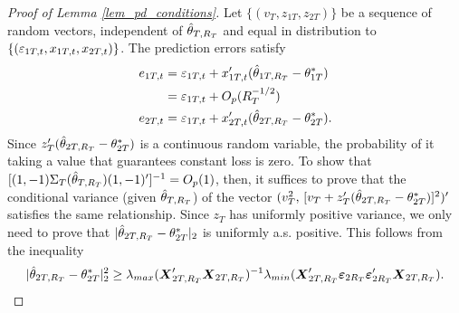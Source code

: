 \documentclass[11pt]{article} \def\baselinestretch{1.08}
\begin{document}
\begin{proof}[Proof of Lemma \ref{lem_pd_conditions}]
  Let $\{(v_T, z_{1T}, z_{2T})\}$ be a sequence of random vectors,
  independent of $\hat \theta_{{}T,{R_T}}$ and equal in distribution to
  $\{(\varepsilon_{{1}T,{t}},x_{{1}T,{t}},x_{{2}T,{t}})\}$.  The prediction errors satisfy
  \begin{align*}
    e_{{1}T,{t}} &= \varepsilon_{{1}T,{t}} + x_{{1}T,{t}}'(\hat \theta_{{1}T,{R_T}} - \theta^*_{{1}T}) 
    \\ & = \varepsilon_{{1}T,{t}} + O_p(R_T^{-1/2}) \\
    e_{{2}T,{t}} &= \varepsilon_{{1}T,{t}} + x_{{2}T,{t}}'(\hat \theta_{{2}T,{R_T}} - \theta^*_{{2}T}).
  \end{align*}
  Since $z_T'(\hat \theta_{{2}T,{R_T}}- \theta^*_{{2}T})$ is a continuous random variable,
  the probability of it taking a value that guarantees constant loss
  is zero.
  To show that $[(1,-1) \Sigma_T({\hat \theta_{{}T,{R_T}}}) (1,-1)']^{-1} = O_p(1)$, then, it
  suffices to prove that the conditional variance (given $\hat \theta_{{}T,{R_T}}$)
  of the vector $(v_T^2,\, [v_T + z_T'(\hat \theta_{{2}T,{R_T}} -\theta^*_{{2}T})]^2)'$
  satisfies the same relationship. Since $z_T$ has uniformly positive
  variance, we only need to prove that $|\hat \theta_{{2}T,{R_T}} - \theta^*_{{2}T}|_2$ is
  uniformly a.s. positive.  This follows from the inequality
  \[
  |\hat \theta_{{2}T,{R_T}} - \theta^*_{{2}T}|_2^2 \geq
   \lambda_{max}(\boldsymbol{X}_{{2}T,{R_T}}'\boldsymbol{X}_{{2}T,{R_T}})^{-1}
   \lambda_{min}(\boldsymbol{X}_{{2}T,{R_T}}'\boldsymbol{\varepsilon}_{{2}{R_T}} \boldsymbol{\varepsilon}_{{2}{R_T}}'\boldsymbol{X}_{{2}T,{R_T}}).
  \]
\end{proof}
\end{document}
